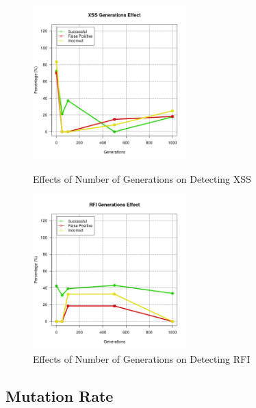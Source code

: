 \begin{appendices}
\begin{figure}[hp]
	\centering
	\includegraphics[height=225px]{./assets/appendix/fullresults/ga/generations/Results_XSS.png}
	\caption{Effects of Number of Generations on Detecting XSS}
	\includegraphics[height=225px]{./assets/appendix/fullresults/ga/generations/Results_RFI.png}
	\caption{Effects of Number of Generations on Detecting RFI}
\end{figure}

\newpage
\subsection{Mutation Rate} \label{app:resMutation}


\end{appendices}
